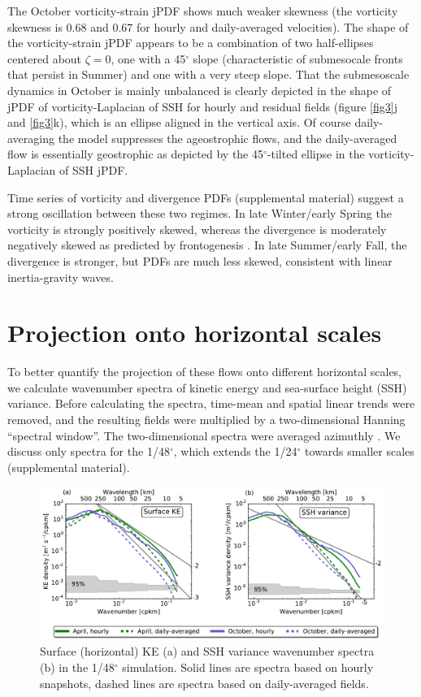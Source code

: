 \documentclass[grl]{agutex2015}
\begin{document}
\begin{article}
The October vorticity-strain jPDF shows much weaker skewness (the vorticity skewness
is 0.68 and 0.67 for hourly and daily-averaged velocities). The shape of the
vorticity-strain jPDF  appears to be a combination of two half-ellipses centered
about $\zeta=0$, one with a 45$^\circ$ slope (characteristic of submesocale fronts
that persist in Summer) and one with a very steep slope.
That the submesoscale dynamics in October is mainly unbalanced is clearly depicted
in the shape of jPDF of vorticity-Laplacian of SSH for hourly and
residual fields
(figure \ref{fig3}j and \ref{fig3}k), which is an ellipse aligned in the vertical axis.
Of course daily-averaging the model suppresses the ageostrophic flows, and
the daily-averaged flow is essentially geostrophic as depicted by the 45$^\circ$-tilted
ellipse in the vorticity-Laplacian of SSH jPDF.

 Time series of vorticity and divergence PDFs (supplemental material) suggest
 a strong oscillation between these two regimes. In late Winter/early Spring
 the vorticity is strongly positively skewed, whereas the divergence is moderately
 negatively skewed as predicted by frontogenesis \citep{capet_etal2008a,mcwilliams2016}
. In late Summer/early Fall, the divergence is stronger, but PDFs are much less skewed,
consistent with linear inertia-gravity waves.

\section{Projection onto horizontal scales}

To better quantify the projection of these flows onto different horizontal
scales, we calculate wavenumber spectra of kinetic energy and sea-surface height
(SSH) variance.  Before calculating the spectra, time-mean and spatial linear
trends were removed, and the resulting fields were multiplied by a two-dimensional Hanning ``spectral window''.
The two-dimensional spectra were averaged azimuthly \citep[e.g., ][]{rocha_etal2016} .
We discuss only spectra for the 1/48$^\circ$, which extends the 1/24$^\circ$
towards smaller scales (supplemental material).



\begin{figure}[ht]
  \begin{center}
    \includegraphics[width=.9\textwidth]{figs/fig4.pdf}
 \caption{Surface (horizontal) KE (a) and SSH variance wavenumber spectra (b)
 in the 1/48$^\circ$ simulation. Solid lines
 are spectra based on hourly snapshots, dashed lines are spectra based on daily-averaged
 fields.}
 \label{fig4}
 \end{center}
\end{figure}



\end{article}
\end{document}

